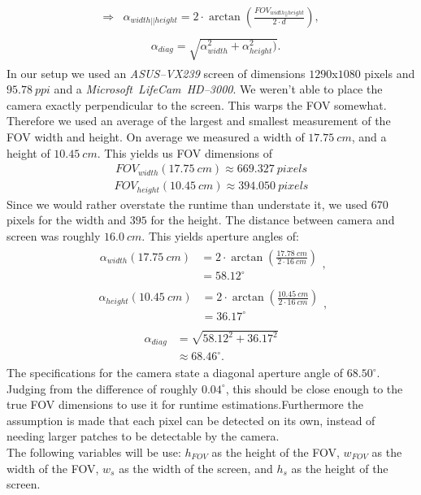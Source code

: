 \documentclass[journal,final,a4paper,twoside]{PS}
\begin{document}
\begin{align}\begin{split}
\Rightarrow &\alpha_{width||height} = 2 \cdot \arctan \left(\frac{FOV_{width||height }}{2\cdot d} \right),
\end{split}
\end{align}
\begin{align}\begin{split}
&\alpha_{diag} = \sqrt{\alpha_{width}^2 + \alpha_{height}^2)}.
\end{split}
\end{align}
In our setup we used an \emph{ASUS--VX239} screen of dimensions $1290$x$1080$ pixels and $95.78~ppi$ and a \emph{Microsoft~LifeCam~HD--3000}. We weren't able to place the camera exactly perpendicular to the screen. This warps the FOV somewhat. Therefore we used an average of the largest and smallest measurement of the FOV width and height. On average we measured a width of $17.75~cm$, and a height of $10.45~cm$. This yields us FOV dimensions of
\begin{align*}
FOV_{width}(17.75~cm) \approx 669.327~pixels
\end{align*}
\begin{align*}
FOV_{height}(10.45~cm) \approx 394.050~pixels
\end{align*}
Since we would rather overstate the runtime than understate it, we used $670$ pixels for the width and $395$ for the height. The distance between camera and screen was roughly $16.0~cm$. This yields aperture angles of:
\begin{align}\begin{split}
\alpha_{width}(17.75~cm)&= 2 \cdot \arctan\left(\frac{17.78~cm}{2 \cdot 16~cm}\right) \\&= 58.12^{\circ}\end{split},
\end{align}
\begin{align}\begin{split}
\alpha_{height}(10.45~cm) &= 2 \cdot\arctan\left(\frac{10.45~cm}{2 \cdot 16~cm}\right) \\&= 36.17^{\circ}\end{split},
\end{align}
\begin{align}\begin{split}
\alpha_{diag} &= \sqrt{58.12^2 + 36.17^2} \\& \approx 68.46^{\circ}.\end{split}
\end{align}
The specifications for the camera state a diagonal aperture angle of $68.50^{\circ}$. Judging from the difference of roughly $0.04^{\circ}$, this should be close enough to the true FOV dimensions to use it for runtime estimations.Furthermore the assumption is made that each pixel can be detected on its own, instead of needing larger patches to be detectable by the camera.\\
The following variables will be use: $h_{FOV}$ as the height of the FOV, $w_{FOV}$ as the width of the FOV, $w_s$ as the width of the screen, and $h_s$ as the height of the screen.\\
\end{document}
